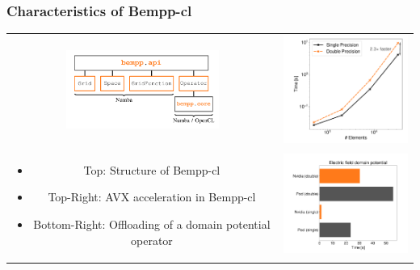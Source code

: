 \documentclass[dvipsnames,10pt]{beamer}
\begin{document}
\begin{frame}
    \frametitle{Characteristics of Bempp-cl}
    \vspace{-.1cm}
    \begin{center}
        \begin{tabular}{cc}
            \includegraphics[width=5cm]{../figs/bempp_cl_overview.png} & 
            \includegraphics[width=5cm]{../figs/bempp_single_vs_double.png} \\
            \begin{minipage}{5cm}
                \vspace{-4cm}
                \begin{itemize}
                    \item Top: Structure of Bempp-cl
                    \item Top-Right: AVX acceleration in Bempp-cl
                    \item Bottom-Right: Offloading of a domain potential operator
                \end{itemize}
            \end{minipage}&
            \includegraphics[width=5cm]{../figs/gpu_offloading.png} 
        \end{tabular}
    \end{center}
\end{frame}
\end{document}
